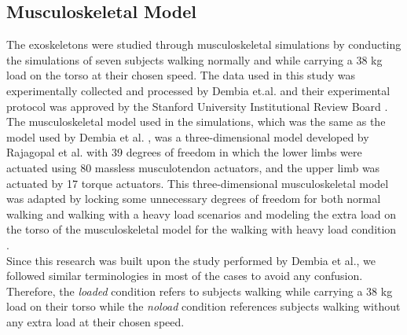 \documentclass[10pt,letterpaper]{article}
\begin{document}
\subsection*{Musculoskeletal Model}
The exoskeletons were studied through musculoskeletal simulations by conducting the simulations of seven subjects walking normally and while carrying a 38 kg load on the torso at their chosen speed. The data used in this study was experimentally collected and processed by Dembia et.al. \cite{93} and their experimental protocol was approved by the Stanford University Institutional Review Board \cite{93}.\\
The musculoskeletal model used in the simulations, which was the same as the model used by Dembia et al. \cite{93}, was a three-dimensional model developed by Rajagopal et al. \cite{130} with 39 degrees of freedom in which the lower limbs were actuated using 80 massless musculotendon actuators, and the upper limb was actuated by 17 torque actuators\cite{130}. This three-dimensional musculoskeletal model was adapted by locking some unnecessary degrees of freedom for both normal walking and walking with a heavy load scenarios and modeling the extra load on the torso of the musculoskeletal model for the walking with heavy load condition \cite{93}.\\
Since this research was built upon the study performed by Dembia et al., we followed similar terminologies in most of the cases to avoid any confusion. Therefore, the \textit{loaded} condition refers to subjects walking while carrying a 38 kg load on their torso while the \textit{noload} condition references subjects walking without any extra load at their chosen speed.
\end{document}
